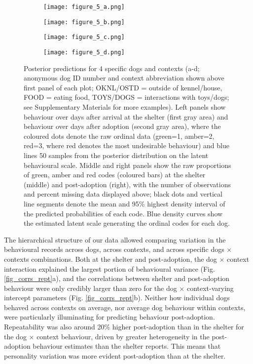 \documentclass[fleqn,10pt]{wlscirep}
\begin{document}
\begin{figure}[t!]
  \centering
  \begin{subfigure}{1\textwidth}
    \centering
    \texttt{[image: figure\_5\_a.png]}
  \end{subfigure}
  \begin{subfigure}{1\textwidth}
    \centering
    \vspace{-0.6cm}
    \texttt{[image: figure\_5\_b.png]}
  \end{subfigure}
  \begin{subfigure}{1\textwidth}
    \centering
    \vspace{-0.6cm}
    \texttt{[image: figure\_5\_c.png]}
  \end{subfigure}
  \begin{subfigure}{1\textwidth}
    \centering
    \vspace{-0.6cm}
    \texttt{[image: figure\_5\_d.png]}
  \end{subfigure}%
  \caption{\footnotesize{
  Posterior predictions for 4 specific dogs and contexts (a-d; anonymous dog ID number and context abbreviation shown above first panel of each plot; OKNL/OSTD = outside of kennel/house, FOOD = eating food, TOYS/DOGS = interactions with toys/dogs; see Supplementary Materials for more examples). Left panels show behaviour over days after arrival at the shelter (first gray area) and behaviour over days after adoption (second gray area), where the coloured dots denote the raw ordinal data (green=1, amber=2, red=3, where red denotes the most undesirable behaviour) and blue lines 50 samples from the posterior distribution on the latent behavioural scale. Middle and right panels show the raw proportions of green, amber and red codes (coloured bars) at the shelter (middle) and post-adoption (right), with the number of observations and percent missing data displayed above; black dots and vertical line segments denote the mean and 95\% highest density interval of the predicted probabilities of each code. Blue density curves show the estimated latent scale generating the ordinal codes for each dog.}
  }
  \label{fig_pps}
\end{figure}

The hierarchical structure of our data allowed comparing variation in the behavioural records across dogs, across contexts, and across specific dogs $\times$ contexts combinations. Both at the shelter and post-adoption, the dog $\times$ context interaction explained the largest portion of behavioural variance (Fig. \ref{fig_corrs_rept}a), and the correlations between shelter and post-adoption behaviour were only credibly larger than zero for the dog $\times$ context-varying intercept parameters (Fig. \ref{fig_corrs_rept}b). Neither how individual dogs behaved across contexts on average, nor average dog behaviour within contexts, were particularly illuminating for predicting behaviour post-adoption. Repeatability was also around 20\% higher post-adoption than in the shelter for the dog $\times$ context behaviour, driven by greater heterogeneity in the post-adoption behaviour estimates than the shelter reports. This means that personality variation was more evident post-adoption than at the shelter.
\end{document}
